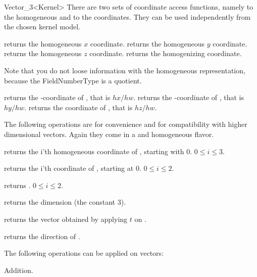 \begin{ccRefClass} {Vector_3<Kernel>}
There are two sets of coordinate access functions, namely to the
homogeneous and to the  coordinates. They can be used
independently from the chosen kernel model.

       {returns the homogeneous $x$ coordinate.}
\ccGlue
{}
       {returns the homogeneous $y$ coordinate.}
\ccGlue
{}
       {returns the homogeneous $z$ coordinate.}
\ccGlue
{}
       {returns the homogenizing  coordinate.}

Note that you do not loose information with the homogeneous
representation, because the FieldNumberType is a quotient.

       {returns the -coordinate of \ccVar, that is $hx/hw$.}
\ccGlue
{}
       {returns the -coordinate of \ccVar, that is $hy/hw$.}
\ccGlue
{}
       {returns the  coordinate of \ccVar, that is $hz/hw$.}

The following operations are for convenience and for compatibility
with higher dimensional vectors.  Again they come in a
 and homogeneous flavor.

       {returns the i'th homogeneous coordinate of \ccVar, starting with 0.
        \ccPrecond $0\leq i \leq 3$.}

       {returns the i'th  coordinate of \ccVar, starting at 0.
        \ccPrecond $0\leq i \leq 2$.}

       {returns  .
        \ccPrecond $0\leq i \leq 2$.}

       {returns the dimension (the constant 3).}

       {returns the vector obtained by applying $t$ on \ccVar.}

       {returns the direction of \ccVar.}


The following operations can be applied on vectors:

       {Addition.}


\end{ccRefClass}
